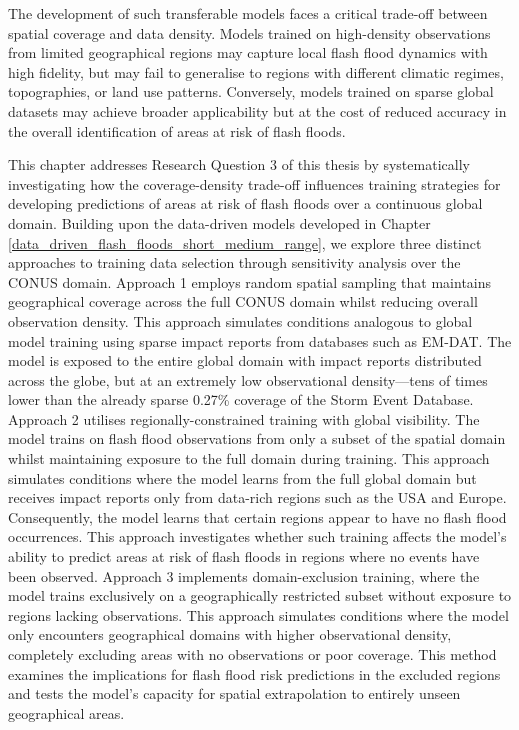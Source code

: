 The development of such transferable models faces a critical trade-off between spatial coverage and data density. Models trained on high-density observations from limited geographical regions may capture local flash flood dynamics with high fidelity, but may fail to generalise to regions with different climatic regimes, topographies, or land use patterns. Conversely, models trained on sparse global datasets may achieve broader applicability but at the cost of reduced accuracy in the overall identification of areas at risk of flash floods. 

This chapter addresses Research Question 3 of this thesis by systematically investigating how the coverage-density trade-off influences training strategies for developing predictions of areas at risk of flash floods over a continuous global domain. Building upon the data-driven models developed in Chapter \ref{data_driven_flash_floods_short_medium_range}, we explore three distinct approaches to training data selection through sensitivity analysis over the CONUS domain. Approach 1 employs random spatial sampling that maintains geographical coverage across the full CONUS domain whilst reducing overall observation density. This approach simulates conditions analogous to global model training using sparse impact reports from databases such as EM-DAT. The model is exposed to the entire global domain with impact reports distributed across the globe, but at an extremely low observational density—tens of times lower than the already sparse 0.27\% coverage of the Storm Event Database. Approach 2 utilises regionally-constrained training with global visibility. The model trains on flash flood observations from only a subset of the spatial domain whilst maintaining exposure to the full domain during training. This approach simulates conditions where the model learns from the full global domain but receives impact reports only from data-rich regions such as the USA and Europe. Consequently, the model learns that certain regions appear to have no flash flood occurrences. This approach investigates whether such training affects the model's ability to predict areas at risk of flash floods in regions where no events have been observed. Approach 3 implements domain-exclusion training, where the model trains exclusively on a geographically restricted subset without exposure to regions lacking observations. This approach simulates conditions where the model only encounters geographical domains with higher observational density, completely excluding areas with no observations or poor coverage. This method examines the implications for flash flood risk predictions in the excluded regions and tests the model's capacity for spatial extrapolation to entirely unseen geographical areas.

